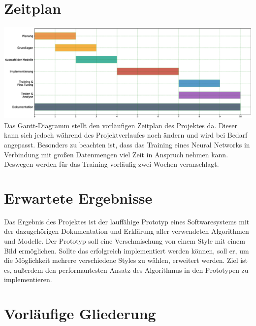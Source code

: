 \section{Zeitplan}
\includegraphics[width=1.00\textwidth]{resources/gantt.eps}
Das Gantt-Diagramm stellt den vorläufigen Zeitplan des Projektes da.
Dieser kann sich jedoch während des Projektverlaufes noch ändern und wird bei Bedarf angepasst.
Besonders zu beachten ist, dass das Training eines Neural Networks in Verbindung mit großen Datenmengen viel Zeit in Anspruch nehmen kann.
Deswegen werden für das Training vorläufig zwei Wochen veranschlagt.

\section{Erwartete Ergebnisse}
Das Ergebnis des Projektes ist der lauffähige Prototyp eines Softwaresystems mit der dazugehörigen Dokumentation und Erklärung
aller verwendeten Algorithmen und Modelle. Der Prototyp soll eine Verschmischung von einem Style mit einem Bild ermöglichen. 
Sollte das erfolgreich implementiert werden können, soll er, um die Möglichkeit mehrere verschiedene Styles zu wählen, erweitert werden.
Ziel ist es, außerdem den performantesten Ansatz des Algorithmus in den Prototypen zu implementieren.

\pagebreak

\section{Vorläufige Gliederung}

